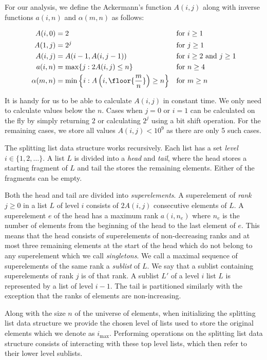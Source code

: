 For our analysis, we define the Ackermann's function $A(i,j)$ along with inverse functions $a(i,n)$ and $\alpha(m, n)$ as follows:

\begin{align*}
    A(i,0) &= 2 &&\text{for $i \geq 1$} \\
    A(1,j) &= 2^j &&\text{for $j \geq 1$} \\
    A(i,j) &= A(i-1,A(i, j-1)) &&\text{for $i \geq 2$ and $j \geq 1$} \\
    a(i,n) &= \max \{ j: 2A(i,j) \leq n \} &&\text{for $n \geq 4$} \\
    \alpha(m,n) &= \min \left\{ i: A\left(i,\floor{\frac{m}{n}}\right) \geq n \right\} &&\text{for $m \geq n$}
\end{align*}

It is handy for us to be able to calculate $A(i,j)$ in constant time. We only need to calculate values below the $n$. Cases when $j = 0$ or $i = 1$ can be calculated on the fly by simply returning $2$ or calculating $2^j$ using a bit shift operation. For the remaining cases, we store all values $A(i,j) < 10^9$ as there are only 5 such cases.

The splitting list data structure works recursively. Each list has a set \textit{level} $i \in \{1, 2, \dots \}$. A list $L$ is divided into a \textit{head} and \textit{tail}, where the head stores a starting fragment of $L$ and tail the stores the remaining elements. Either of the fragments can be empty. 

Both the head and tail are divided into \textit{superelements}. A superelement of \textit{rank} $j \geq 0$ in a list $L$ of level $i$ consists of $2A(i,j)$ consecutive elements of $L$. A superelement $e$ of the head has a maximum rank $a(i, n_e)$ where $n_e$ is the number of elements from the beginning of the head to the last element of $e$. This means that the head consists of superelements of non-decreasing ranks and at most three remaining elements at the start of the head which do not belong to any superelement which we call \textit{singletons}. We call a maximal sequence of superelements of the same rank a \textit{sublist} of $L$. We say that a sublist containing superelements of rank $j$ is of that rank. A sublist $L'$ of a level $i$ list $L$ is represented by a list of level $i-1$. The tail is partitioned similarly with the exception that the ranks of elements are non-increasing. 

Along with the size $n$ of the universe of elements, when initializing the splitting list data structure we provide the chosen level of lists used to store the original elements which we denote as $i_{\max}$. Performing operations on the splitting list data structure consists of interacting with these top level lists, which then refer to their lower level sublists.

